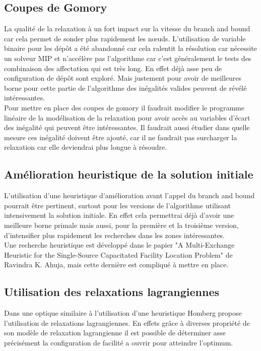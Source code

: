 \documentclass[12pt,a4paper]{article}
\begin{document}
\subsection{Coupes de Gomory}

La qualité de la relaxation à un fort impact sur la vitesse du branch and bound car cela permet de sonder plus rapidement les nœuds. L'utilisation de variable binaire pour les dépôt a été abandonné car cela ralentit la résolution car nécessite un solveur MIP et n'accélère pas l'algorithme car c'est généralement le tests des combinaison des affectation qui est très long. En effet déjà asse peu de configuration de dépôt sont exploré. Mais justement pour avoir de meilleures borne pour cette partie de l'algorithme des inégalités valides peuvent de révélé intéressantes.\\

Pour mettre en place des coupes de gomory il faudrait modifier le programme linéaire de la modélisation de la relaxation pour avoir accès au variables d'écart des inégalité qui peuvent être intéressantes. Il faudrait aussi étudier dans quelle mesure ces inégalité doivent être ajouté, car il ne faudrait pas surcharger la relaxation car elle deviendrai plus longue à résoudre.

\subsection{Amélioration heuristique de la solution initiale}

L'utilisation d'une heuristique d'amélioration avant l'appel du branch and bound pourrait être pertinent, surtout pour les versions de l'algorithme utilisant intensivement la solution initiale. En effet cela permettrai déjà d'avoir une meilleure borne primale mais aussi, pour la première et la troisième version, d'intensifier plus rapidement les recherches dans les zones intéressantes.\\

Une recherche heuristique est développé dans le papier "A Multi-Exchange Heuristic for the Single-Source Capacitated Facility Location Problem" de Ravindra K. Ahuja, mais cette dernière est compliqué à mettre en place.

\subsection{Utilisation des relaxations lagrangiennes}

Dans une optique similaire à l'utilisation d'une heuristique Homberg propose l'utilisation de relaxations lagrangiennes. En effets grâce à diverses propriété de son modèle de relaxation lagrangienne il est possible de déterminer asse précisément la configuration de facilité a ouvrir pour atteindre l'optimum.\\
\end{document}
